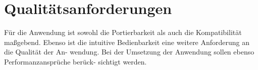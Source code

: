 \section{Qualitätsanforderungen}
\label{sec:Qualitaetsanforderungen}

Für die Anwendung ist sowohl die Portierbarkeit als auch die Kompatibilität maßgebend.
Ebenso ist die intuitive Bedienbarkeit eine weitere Anforderung an die Qualität der An-
wendung. Bei der Umsetzung der Anwendung sollen ebenso Performanzansprüche berück-
sichtigt werden.